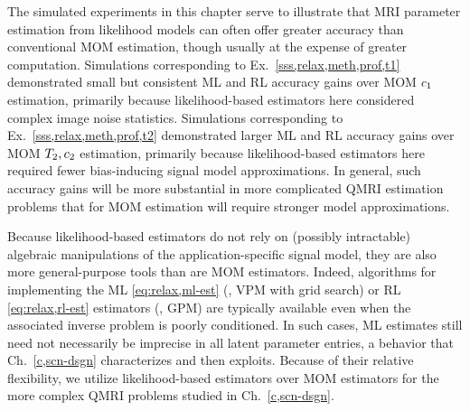 The simulated experiments in this chapter
serve to illustrate
that MRI parameter estimation
from likelihood models  
can often offer greater accuracy
than conventional MOM estimation,
though usually at the expense 
of greater computation.
Simulations corresponding to Ex.~\ref{sss,relax,meth,prof,t1}
demonstrated small but consistent ML and RL accuracy gains 
over MOM $c_{1}$ estimation,
primarily because likelihood-based estimators 
here considered complex image noise statistics.
Simulations corresponding to Ex.~\ref{sss,relax,meth,prof,t2}
demonstrated larger ML and RL accuracy gains
over MOM $T_2,c_{2}$ estimation,
primarily because likelihood-based estimators
here required fewer bias-inducing signal model approximations.
In general,
such accuracy gains 
will be more substantial
in more complicated QMRI estimation problems
that for MOM estimation 
will require stronger model approximations.

Because likelihood-based estimators do not rely 
on (possibly intractable) algebraic manipulations 
of the application-specific signal model,
they are also more general-purpose tools 
than are MOM estimators.
Indeed, 
algorithms for implementing the ML \eqref{eq:relax,ml-est}
(\ie, VPM with grid search)
or RL \eqref{eq:relax,rl-est} estimators
(\ie, GPM)
are typically available
even when the associated inverse problem
is poorly conditioned.
In such cases,
ML estimates still need not necessarily be imprecise
in all latent parameter entries,
a behavior that Ch.~\ref{c,scn-dsgn}
characterizes and then exploits.
Because of their relative flexibility,
we utilize likelihood-based estimators
over MOM estimators
for the more complex QMRI problems
studied in Ch.~\ref{c,scn-dsgn}.

